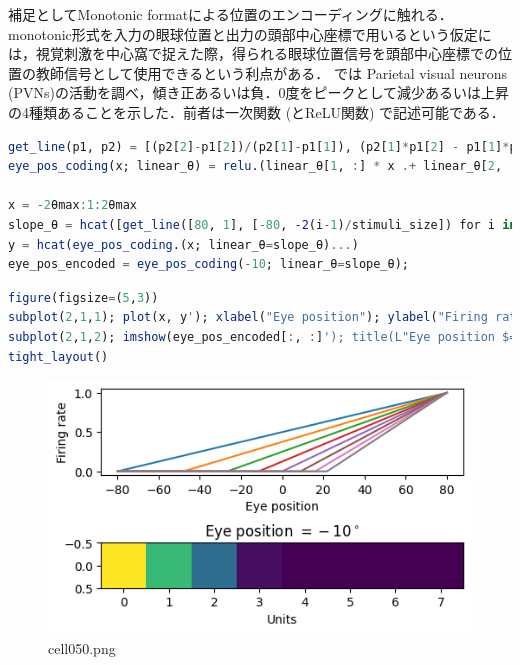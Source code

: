 補足としてMonotonic formatによる位置のエンコーディングに触れる．monotonic形式を入力の眼球位置と出力の頭部中心座標で用いるという仮定には，視覚刺激を中心窩で捉えた際，得られる眼球位置信号を頭部中心座標での位置の教師信号として使用できるという利点がある．\citep{Andersen1983-zp} では Parietal visual neurons (PVNs)の活動を調べ，傾き正あるいは負．0度をピークとして減少あるいは上昇の4種類あることを示した．前者は一次関数 (とReLU関数) で記述可能である．
\begin{lstlisting}[language=julia]
get_line(p1, p2) = [(p2[2]-p1[2])/(p2[1]-p1[1]), (p2[1]*p1[2] - p1[1]*p2[2])/(p2[1]-p1[1])] # [slope, intercept]
eye_pos_coding(x; linear_θ) = relu.(linear_θ[1, :] * x .+ linear_θ[2, :])

x = -2θmax:1:2θmax
slope_θ = hcat([get_line([80, 1], [-80, -2(i-1)/stimuli_size]) for i in 1:stimuli_size]...)
y = hcat(eye_pos_coding.(x; linear_θ=slope_θ)...)
eye_pos_encoded = eye_pos_coding(-10; linear_θ=slope_θ);
\end{lstlisting}
\begin{lstlisting}[language=julia]
figure(figsize=(5,3))
subplot(2,1,1); plot(x, y'); xlabel("Eye position"); ylabel("Firing rate")
subplot(2,1,2); imshow(eye_pos_encoded[:, :]'); title(L"Eye position $=-10^\circ$"); xlabel("Units") 
tight_layout()
\end{lstlisting}
\begin{figure}[ht]
	\centering
	\includegraphics[scale=0.8, max width=\linewidth]{./fig/solve-credit-assignment-problem/backpropagation/cell050.png}
	\caption{cell050.png}
	\label{cell050.png}
\end{figure}
